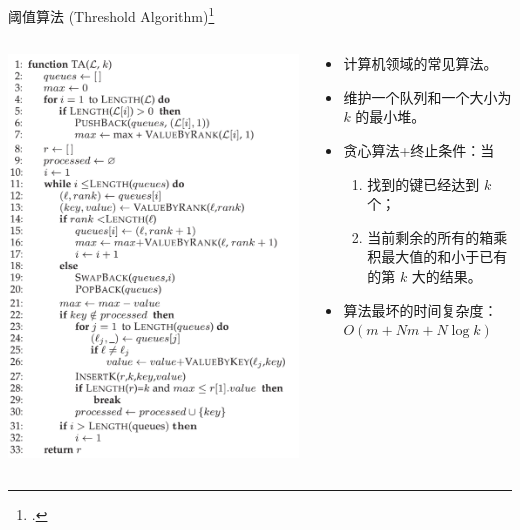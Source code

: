 \documentclass[10pt,aspectratio=169]{beamer}
\begin{document}
\begin{frame}{阈值算法 (Threshold Algorithm)\footcite{FAGIN2003614}}
    \begin{columns}
        \begin{column}{.3\textwidth}
            \includegraphics[width=\textwidth]{pic/ta.png}
        \end{column}
        \begin{column}{.7\textwidth}
            \begin{itemize}[<+->]
                \item 计算机领域的常见算法。
                \item 维护一个队列和一个大小为 $k$ 的最小堆。
                \item 贪心算法+终止条件：当
                      \begin{enumerate}
                          \item 找到的键已经达到 $k$ 个；
                          \item 当前剩余的所有的箱乘积最大值的和小于已有的第 $k$ 大的结果。
                      \end{enumerate}
                \item 算法最坏的时间复杂度：$O(m + Nm + N \log k)$
            \end{itemize}
        \end{column}
    \end{columns}
\end{frame}
\end{document}
